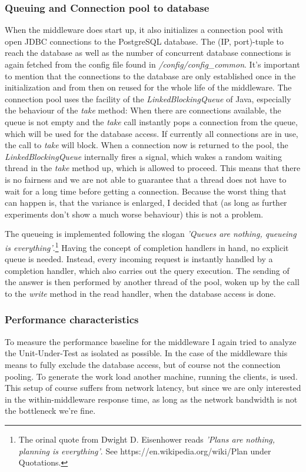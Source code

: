 \documentclass[11pt]{article}
\begin{document}
\subsubsection{Queuing and Connection pool to database}\label{sec:queuing-and-connection-pool-to-database}
When the middleware does start up, it also initializes a connection pool with open JDBC connections to the PostgreSQL database. The (IP, port)-tuple to reach the database as well as the number of concurrent database connections is again fetched from the config file found in \textit{/config/config\_common}. It's important to mention that the connections to the database are only established once in the initialization and from then on reused for the whole life of the middleware. The connection pool uses the facility of the \textit{LinkedBlockingQueue} of Java, especially the behaviour of the \textit{take} method: When there are connections available, the queue is not empty and the \textit{take} call instantly pops a connection from the queue, which will be used for the database access. If currently all connections are in use, the call to \textit{take} will block. When a connection now is returned to the pool, the \textit{LinkedBlockingQueue} internally fires a signal, which wakes a random waiting thread in the \textit{take} method up, which is allowed to proceed. This means that there is no fairness and we are not able to guarantee that a thread does not have to wait for a long time before getting a connection. Because the worst thing that can happen is, that the variance is enlarged, I decided that (as long as further experiments don't show a much worse behaviour) this is not a problem.

The queueing is implemented following the slogan \textit{'Queues are nothing, queueing is everything'}.\footnote{The orinal quote from Dwight D. Eisenhower reads \textit{'Plans are nothing, planning is everything'}. See https://en.wikipedia.org/wiki/Plan under Quotations.} Having the concept of completion handlers in hand, no explicit queue is needed. Instead, every incoming request is instantly handled by a completion handler, which also carries out the query execution. The sending of the answer is then performed by another thread of the pool, woken up by the call to the \textit{write} method in the read handler, when the database access is done.

\subsubsection{Performance characteristics}\label{sec:performance-characteristics-1}
To measure the performance baseline for the middleware I again tried to analyze the Unit-Under-Test as isolated as possible. In the case of the middleware this means to fully exclude the database access, but of course not the connection pooling. To generate the work load another machine, running the clients, is used. This setup of course suffers from network latency, but since we are only interested in the within-middleware response time, as long as the network bandwidth is not the bottleneck we're fine.
\end{document}
